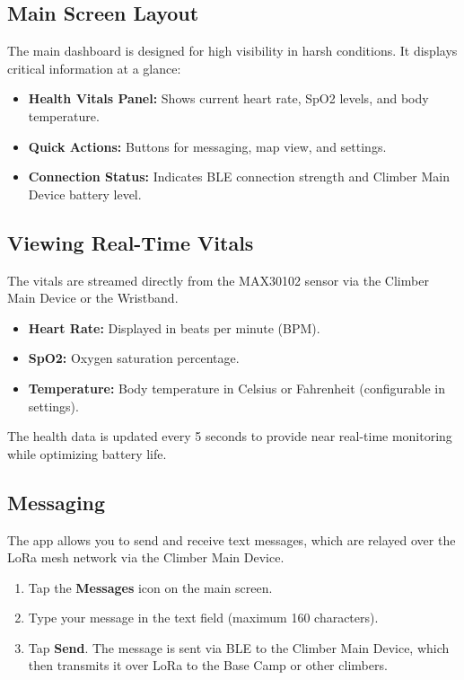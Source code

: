 \subsection{Main Screen Layout}
The main dashboard is designed for high visibility in harsh conditions. It displays critical information at a glance:
\begin{itemize}
    \item \textbf{Health Vitals Panel:} Shows current heart rate, SpO2 levels, and body temperature.
    \item \textbf{Quick Actions:} Buttons for messaging, map view, and settings.
    \item \textbf{Connection Status:} Indicates BLE connection strength and Climber Main Device battery level.
\end{itemize}

\subsection{Viewing Real-Time Vitals}
The vitals are streamed directly from the MAX30102 sensor via the Climber Main Device or the Wristband. 
\begin{itemize}
    \item \textbf{Heart Rate:} Displayed in beats per minute (BPM).
    \item \textbf{SpO2:} Oxygen saturation percentage.
    \item \textbf{Temperature:} Body temperature in Celsius or Fahrenheit (configurable in settings).
\end{itemize}

\begin{infobox}
The health data is updated every 5 seconds to provide near real-time monitoring while optimizing battery life.
\end{infobox}

\subsection{Messaging}
The app allows you to send and receive text messages, which are relayed over the LoRa mesh network via the Climber Main Device.

\begin{enumerate}
    \item Tap the \textbf{Messages} icon on the main screen.
    \item Type your message in the text field (maximum 160 characters).
    \item Tap \textbf{Send}. The message is sent via BLE to the Climber Main Device, which then transmits it over LoRa to the Base Camp or other climbers.
\end{enumerate}

